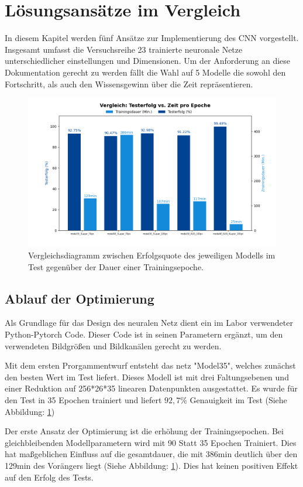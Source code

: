 \documentclass[journal,twoside,web]{ieeecolor}
\begin{document}
\section{Lösungsansätze im Vergleich}
In diesem Kapitel werden fünf Ansätze zur Implementierung des CNN vorgestellt. Insgesamt umfasst die Versuchsreihe 23 trainierte neuronale Netze unterschiedlicher einstellungen und Dimensionen.
Um der Anforderung an diese Dokumentation gerecht zu werden fällt die Wahl auf 5 Modelle die sowohl den Fortschritt, als auch den Wissensgewinn über die Zeit repräsentieren.

\begin{figure}[H]
    \centerline{\includegraphics[width=\columnwidth]{Erfolg_Dauer.png}}
    \caption{Vergleichsdiagramm zwischen Erfolgsquote des jeweiligen Modells im Test gegenüber der Dauer einer Trainingsepoche.}
    \label{fig:compareGraph}
\end{figure}

\subsection{Ablauf der Optimierung}
Als Grundlage für das Design des neuralen Netz dient ein im Labor verwendeter Python-Pytorch Code. Dieser Code ist in seinen Parametern ergänzt, um den verwendeten Bildgrößen und Bildkanälen gerecht zu werden. 

Mit dem ersten Prorgammentwurf entsteht das netz "Model35", welches zunächst den besten Wert im Test liefert. Dieses Modell ist mit drei Faltungsebenen und einer Reduktion auf 256*26*35 linearen Datenpunkten ausgestattet.
Es wurde für den Test in 35 Epochen trainiert und liefert $92,7\%$ Genauigkeit im Test (Siehe Abbildung: \ref{fig:compareGraph})

Der erste Ansatz der Optimierung ist die erhöhung der Trainingsepochen. Bei gleichbleibenden Modellparametern wird mit 90 Statt 35 Epochen Trainiert.
Dies hat maßgeblichen Einfluss auf die gesamtdauer, die mit 386min deutlich über den 129min des Vorängers liegt (Siehe Abbildung: \ref{fig:compareGraph}). Dies hat keinen positiven Effekt auf den Erfolg des Tests.
\end{document}

